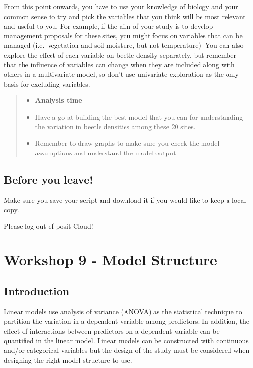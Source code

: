 \documentclass[
]{book}
\providecommand{\tightlist}{%
  \setlength{\itemsep}{0pt}\setlength{\parskip}{0pt}}
\begin{document}
From this point onwards, you have to use your knowledge of biology and your common sense to try and pick the variables that you think will be most relevant and useful to you. For example, if the aim of your study is to develop management proposals for these sites, you might focus on variables that can be managed (i.e.~vegetation and soil moisture, but not temperature). You can also explore the effect of each variable on beetle density separately, but remember that the influence of variables can change when they are included along with others in a multivariate model, so don't use univariate exploration as the only basis for excluding variables.

\begin{quote}
\begin{itemize}
\tightlist
\item
  \textbf{Analysis time}
\item
  Have a go at building the best model that you can for understanding the variation in beetle densities among these 20 sites.
\item
  Remember to draw graphs to make sure you check the model assumptions and understand the model output
\end{itemize}
\end{quote}

\section{Before you leave!}\label{before-you-leave-7}

Make sure you save your script and download it if you would like to keep a local copy.

Please log out of posit Cloud!

\chapter{Workshop 9 - Model Structure}\label{workshop-9---model-structure}

\section{Introduction}\label{introduction-7}

Linear models use analysis of variance (ANOVA) as the statistical technique to partition the variation in a dependent variable among predictors. In addition, the effect of interactions between predictors on a dependent variable can be quantified in the linear model. Linear models can be constructed with continuous and/or categorical variables but the design of the study must be considered when designing the right model structure to use.
\end{document}
